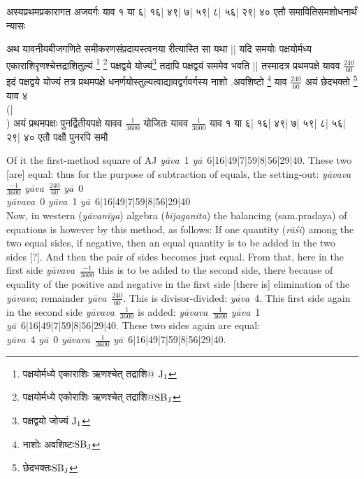 \documentclass[11pt,a5paper]{book}
\def\bijaganita{\textit{b\={\i}ja\-ga\*ni\-ta}}
\def\ya{\textit{y\=a}}
\def\yava{\textit{y\=ava}}
\def\yavava{\textit{y\=avava}}
\def\rasi{\textit{rāśi}}
\def\yavaniya{\textit{y\=avan\=iya}}
\def\bijaganita{\textit{b\=ijaga\*nita}}
\def\nl{\hfill\break}
\begin{document}
\newpage

{\s 
अस्यप्रथमप्रकारागत अजवर्गः याव १ या ६| १६| ४९| ७| ५९| ८| ५६| २९| ४०
एतौ समावितिसमशोधनार्थं न्यासः

अथ यावनीयबीजगणिते समीकरणसंप्रदायस्त्वनया रीत्यास्ति
सा यथा ||
यदि समयोः पक्षयोर्मध्य एकाराशिरृण\-श्चेत्तद्राशितुल्यं
\footnote{{\s पक्षयोर्मध्ये एकाराशिः ऋणश्चेत् तद्राशि@ }${\rm J_1}$} \footnote{{\s पक्षयोर्मध्ये एकोराशिः ऋणश्चेत् तद्राशि@}${\rm SB_J}$}
पक्षद्वये योज्यं\footnote{{\s पक्षद्वयो जोज्यं }${\rm J_1}$}
तदापि पक्षद्वयं सममेव भवति ||
तस्मादत्र प्रथमपक्षे यावव %
$\frac{\dot{240}}{60}$
इदं पक्षद्वये योज्यं तत्र प्रथमपक्षे
धनर्णयोस्तुल्यत्वाद्यावद्वर्गवर्गस्य नाशो .अवशिष्टो \footnote{{\s नाशोः अवशिष्टः}${\rm SB_J}$}
याव $\frac{240}{60}$
अयं छेदभक्तो \footnote{{\s छेदभक्तः}${\rm SB_J}$} याव ४\\(|\\) अयं प्रथमपक्षः पुनर्द्वितीयपक्षे
यावव $\frac{1}{3600}$ योजितः यावव $\frac{1}{3600}$
याव १ या ६| १६| ४९| ७| ५९| ८| ५६| २९| ४०
एतौ पक्षौ पुनरपि समौ
}
\newpage

Of it the first-method square
of AJ \yava\ 1 \ya\ 6|16|49|7|59|8|56|29|40. These two [are] equal: thus for the
purpose of subtraction of equals, the setting-out:
\yavava\ $\frac{-1}{3600}$ \yava\ $\frac{240}{60}$ \ya\ 0\\
\yavava\ 0 \yava\ 1 \ya\  6|16|49|7|59|8|56|29|40\\

Now, in western (\yavaniya) algebra (\bijaganita) the balancing (sam.pradaya) of equations is however by this method, as follows: If one quantity (\rasi) among the two equal sides, if negative, then an equal quantity is to be added in the two sides [?]. And then the pair of sides becomes just equal. From
that, here in the first side \yavava\ $\frac{-1}{3600}$ this is to be added to the second side, there
because of equality of the positive and negative in the first side [there is] elimination of the \yavava; remainder \yava\ $\frac{240}{60}$. This is divisor-divided: \yava\ 4. This first side again in the second side \yavava\ $\frac{1}{3600}$ is added: \yavava\  $\frac{1}{3600}$
\yava\ 1 \ya\ 6|16|49|7|59|8|56|29|40. These two sides again are equal:\\
\yava\ 4 \ya\ 0
\yavava\  $\frac{1}{3600}$ \ya\ 6|16|49|7|59|8|56|29|40.
\end{document}
